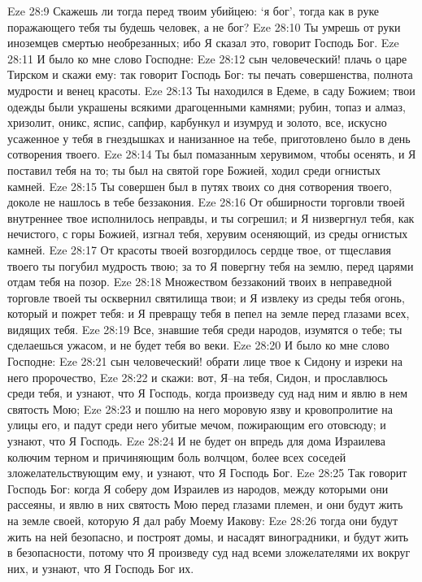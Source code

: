 Eze 28:9  Скажешь ли тогда перед твоим убийцею: `я бог', тогда как в руке поражающего тебя ты будешь человек, а не бог?
Eze 28:10  Ты умрешь от руки иноземцев смертью необрезанных; ибо Я сказал это, говорит Господь Бог.
Eze 28:11  И было ко мне слово Господне:
Eze 28:12  сын человеческий! плачь о царе Тирском и скажи ему: так говорит Господь Бог: ты печать совершенства, полнота мудрости и венец красоты.
Eze 28:13  Ты находился в Едеме, в саду Божием; твои одежды были украшены всякими драгоценными камнями; рубин, топаз и алмаз, хризолит, оникс, яспис, сапфир, карбункул и изумруд и золото, все, искусно усаженное у тебя в гнездышках и нанизанное на тебе, приготовлено было в день сотворения твоего.
Eze 28:14  Ты был помазанным херувимом, чтобы осенять, и Я поставил тебя на то; ты был на святой горе Божией, ходил среди огнистых камней.
Eze 28:15  Ты совершен был в путях твоих со дня сотворения твоего, доколе не нашлось в тебе беззакония.
Eze 28:16  От обширности торговли твоей внутреннее твое исполнилось неправды, и ты согрешил; и Я низвергнул тебя, как нечистого, с горы Божией, изгнал тебя, херувим осеняющий, из среды огнистых камней.
Eze 28:17  От красоты твоей возгордилось сердце твое, от тщеславия твоего ты погубил мудрость твою; за то Я повергну тебя на землю, перед царями отдам тебя на позор.
Eze 28:18  Множеством беззаконий твоих в неправедной торговле твоей ты осквернил святилища твои; и Я извлеку из среды тебя огонь, который и пожрет тебя: и Я превращу тебя в пепел на земле перед глазами всех, видящих тебя.
Eze 28:19  Все, знавшие тебя среди народов, изумятся о тебе; ты сделаешься ужасом, и не будет тебя во веки.
Eze 28:20  И было ко мне слово Господне:
Eze 28:21  сын человеческий! обрати лице твое к Сидону и изреки на него пророчество,
Eze 28:22  и скажи: вот, Я--на тебя, Сидон, и прославлюсь среди тебя, и узнают, что Я Господь, когда произведу суд над ним и явлю в нем святость Мою;
Eze 28:23  и пошлю на него моровую язву и кровопролитие на улицы его, и падут среди него убитые мечом, пожирающим его отовсюду; и узнают, что Я Господь.
Eze 28:24  И не будет он впредь для дома Израилева колючим терном и причиняющим боль волчцом, более всех соседей зложелательствующим ему, и узнают, что Я Господь Бог.
Eze 28:25  Так говорит Господь Бог: когда Я соберу дом Израилев из народов, между которыми они рассеяны, и явлю в них святость Мою перед глазами племен, и они будут жить на земле своей, которую Я дал рабу Моему Иакову:
Eze 28:26  тогда они будут жить на ней безопасно, и построят домы, и насадят виноградники, и будут жить в безопасности, потому что Я произведу суд над всеми зложелателями их вокруг них, и узнают, что Я Господь Бог их.
